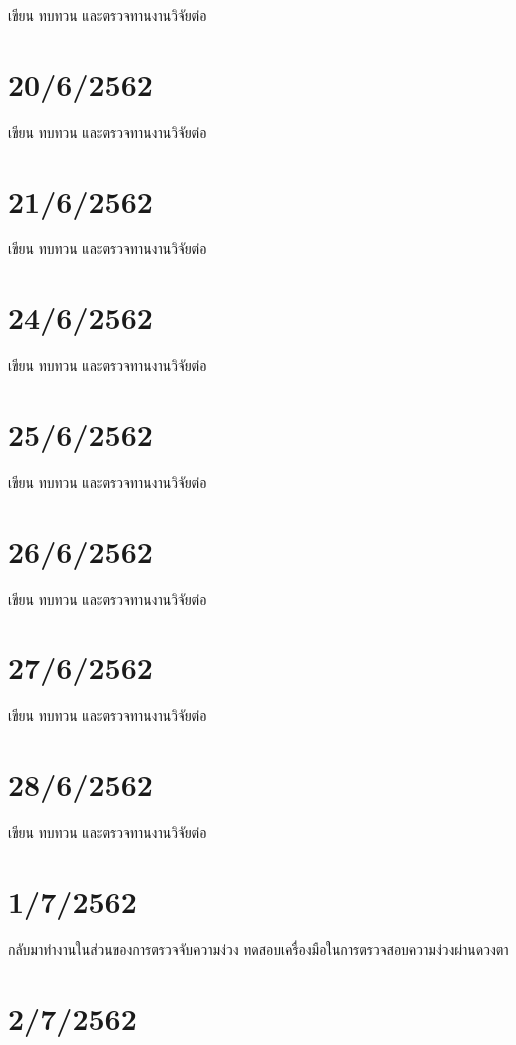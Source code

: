 เขียน ทบทวน และตรวจทานงานวิจัยต่อ

\section*{20/6/2562}

เขียน ทบทวน และตรวจทานงานวิจัยต่อ

\section*{21/6/2562}

เขียน ทบทวน และตรวจทานงานวิจัยต่อ

\section*{24/6/2562}

เขียน ทบทวน และตรวจทานงานวิจัยต่อ

\section*{25/6/2562}

เขียน ทบทวน และตรวจทานงานวิจัยต่อ

\section*{26/6/2562}

เขียน ทบทวน และตรวจทานงานวิจัยต่อ

\section*{27/6/2562}

เขียน ทบทวน และตรวจทานงานวิจัยต่อ

\section*{28/6/2562}

เขียน ทบทวน และตรวจทานงานวิจัยต่อ

\section*{1/7/2562}

กลับมาทำงานในส่วนของการตรวจจับความง่วง ทดสอบเครื่องมือในการตรวจสอบความง่วงผ่านดวงตา

\section*{2/7/2562}

